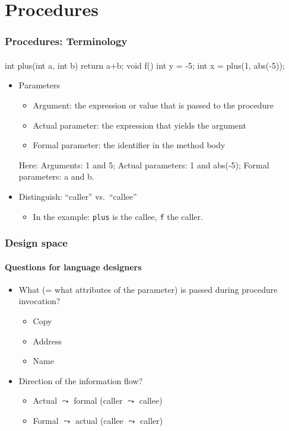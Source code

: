 \documentclass{beamer}
\begin{document}
\section{Procedures}
\begin{frame}[fragile]
\frametitle{Procedures: Terminology}
\framesubtitle{}

\begin{center}
\begin{cplus3}
int plus(int a, int b) {
   return a+b;
}
void f()  {
   int y = -5;
   int x = plus(1, abs(-5));
}
\end{cplus3}
\end{center}

\pause

\begin{itemize}

\item Parameters
\begin{itemize}
\item Argument: the expression or value that is passed to the procedure
\item Actual parameter: the expression that yields the argument 
\item Formal parameter: the identifier in the method body\\
\onslide<+->
\end{itemize}
Here: Arguments: 1 and 5; Actual parameters: 1 and abs(-5); Formal
parameters: a and b. 
\item<+-> Distinguish: ``caller'' vs.\ ``callee''
\begin{itemize}
\item  In the example: \texttt{plus} is the callee, 
\texttt{f} the caller.
\end{itemize}
\end{itemize}
\end{frame}


\begin{frame}[fragile]
\frametitle{Design space}
\framesubtitle{Questions for language designers}
\begin{itemize}
\item What (= what attributes of the parameter) is passed during
procedure invocation? 

\begin{itemize}
\item Copy
\item Address
\item Name 
\end{itemize}
\item Direction of the information flow?
\begin{itemize}
\item Actual $\leadsto$ formal (caller $\leadsto$ callee)
\item Formal $\leadsto$ actual (callee $\leadsto$ caller)
\end{itemize}
\end{itemize}
\end{frame}
\end{document}
